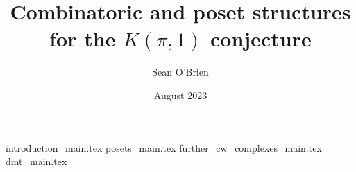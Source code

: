 \documentclass[12pt]{article}
\title{Combinatoric and poset structures for the $K(\pi,1)$ conjecture}
\author{Sean O'Brien}
\date{August 2023}
\begin{document}
\maketitle
{introduction_main.tex}
{posets_main.tex}
{further_cw_complexes_main.tex}
{dmt_main.tex}


\printbibliography
\end{document}
